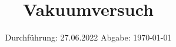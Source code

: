 

\subject{V70}
\title{Vakuumversuch}
\date{%
  Durchführung: 27.06.2022
  \hspace{3em}
  Abgabe: \today
}



\maketitle
\thispagestyle{empty}
\tableofcontents
\newpage

%






\printbibliography{}




